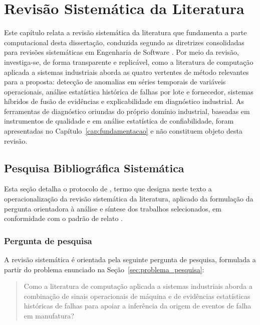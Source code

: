 \chapter{Revisão Sistemática da Literatura}
\label{cap:revisao_sistematica}


Este capítulo relata a revisão sistemática da literatura que fundamenta a parte computacional desta dissertação, conduzida segundo as diretrizes consolidadas para revisões sistemáticas em Engenharia de Software \cite{kitchenham2007guidelines}. Por meio da revisão, investiga-se, de forma transparente e replicável, como a literatura de computação aplicada a sistemas industriais aborda as quatro vertentes de método relevantes para a proposta: detecção de anomalias em séries temporais de variáveis operacionais, análise estatística histórica de falhas por lote e fornecedor, sistemas híbridos de fusão de evidências e explicabilidade em diagnóstico industrial. As ferramentas de diagnóstico oriundas do próprio domínio industrial, baseadas em instrumentos de qualidade e em análise estatística de confiabilidade, foram apresentadas no Capítulo~\ref{cap:fundamentacao} e não constituem objeto desta revisão.


\section{Pesquisa Bibliográfica Sistemática}
\label{sec:pbs}

Esta seção detalha o protocolo de , termo que designa neste texto a operacionalização da revisão sistemática da literatura, aplicado da formulação da pergunta orientadora à análise e síntese dos trabalhos selecionados, em conformidade com o padrão de relato  \cite{page2021prisma}.


\subsection{Pergunta de pesquisa}
\label{subsec:pergunta_pesquisa}

A revisão sistemática é orientada pela seguinte pergunta de pesquisa, formulada a partir do problema enunciado na Seção~\ref{sec:problema_pesquisa}:

\begin{quote}
Como a literatura de computação aplicada a sistemas industriais aborda a combinação de sinais operacionais de máquina e de evidências estatísticas históricas de falhas para apoiar a inferência da origem de eventos de falha em manufatura?
\end{quote}

